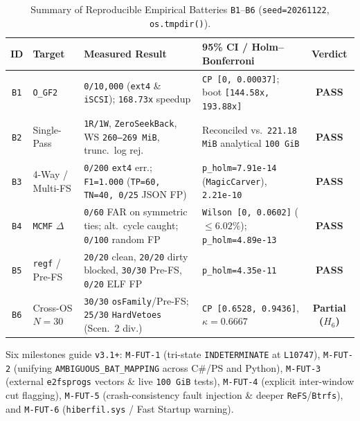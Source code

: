 \documentclass[10pt,twocolumn]{article}
\begin{document}
\begin{table}[t]
\centering
\caption{Summary of Reproducible Empirical Batteries \texttt{B1}--\texttt{B6} (\texttt{seed=20261122}, \texttt{os.tmpdir()}).}
\footnotesize
\begin{tabularx}{\textwidth}{@{}c l Y Y c@{}}
\toprule
\textbf{ID} & \textbf{Target} & \textbf{Measured Result} & \textbf{95\% CI / Holm--Bonferroni} & \textbf{Verdict} \\
\midrule
\texttt{B1} & \texttt{O\_GF2} & \texttt{0/10,000} (\texttt{ext4} \& \texttt{iSCSI}); \texttt{168.73x} speedup & \texttt{CP [0, 0.00037]}; boot \texttt{[144.58x, 193.88x]} & \textbf{PASS} \\
\texttt{B2} & Single-Pass & \texttt{1R/1W}, \texttt{ZeroSeekBack}, WS \texttt{260--269 MiB}, trunc.\ log rej. & Reconciled vs.\ \texttt{221.18 MiB} analytical \texttt{100 GiB} & \textbf{PASS} \\
\texttt{B3} & 4-Way / Multi-FS & \texttt{0/200} \texttt{ext4} err.; \texttt{F1=1.000} (\texttt{TP=60, TN=40, 0/25} JSON FP) & \texttt{p\_holm=7.91e-14} (\texttt{MagicCarver}), \texttt{2.21e-10} & \textbf{PASS} \\
\texttt{B4} & \texttt{MCMF} $\Delta$ & \texttt{0/60} FAR on symmetric ties; alt.\ cycle caught; \texttt{0/100} random FP & \texttt{Wilson [0, 0.0602]} ($\le 6.02\%$); \texttt{p\_holm=4.89e-13} & \textbf{PASS} \\
\texttt{B5} & \texttt{regf} / Pre-FS & \texttt{20/20} clean, \texttt{20/20} dirty blocked, \texttt{30/30} Pre-FS, \texttt{0/20} ELF FP & \texttt{p\_holm=4.35e-11} & \textbf{PASS} \\
\texttt{B6} & Cross-OS $N=30$ & \texttt{30/30} \texttt{osFamily}/Pre-FS; \texttt{25/30} \texttt{HardVetoes} (Scen.\ 2 div.) & \texttt{CP [0.6528, 0.9436]}, $\kappa=0.6667$ & \textbf{Partial ($H_6$)} \\
\bottomrule
\end{tabularx}
\end{table}

Six milestones guide \texttt{v3.1+}: \texttt{M-FUT-1} (tri-state \texttt{INDETERMINATE} at \texttt{L10747}), \texttt{M-FUT-2} (unifying \texttt{AMBIGUOUS\_BAT\_MAPPING} across C\#/PS and Python), \texttt{M-FUT-3} (external \texttt{e2fsprogs} vectors \& live \texttt{100 GiB} tests), \texttt{M-FUT-4} (explicit inter-window cut flagging), \texttt{M-FUT-5} (crash-consistency fault injection \& deeper \texttt{ReFS}/\texttt{Btrfs}), and \texttt{M-FUT-6} (\texttt{hiberfil.sys} / Fast Startup warning).
\end{document}
